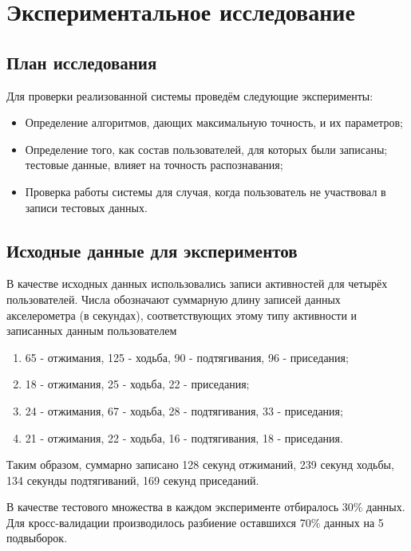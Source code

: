 
\chapter{Экспериментальное исследование}

\section{План исследования}

Для проверки реализованной системы проведём следующие эксперименты:

\begin{itemize}
\item Определение алгоритмов, дающих максимальную точность, и их параметров;
\item Определение того, как состав пользователей, для которых были записаны; тестовые данные, влияет на точность распознавания;
\item Проверка работы системы для случая, когда пользователь не участвовал в записи тестовых данных.
\end{itemize}


\section{Исходные данные для экспериментов}

В качестве исходных данных использовались записи активностей для четырёх пользователей. Числа обозначают суммарную длину записей данных акселерометра (в секундах), соответствующих этому типу активности и записанных данным пользователем

\begin{enumerate}
\item 65 - отжимания, 125 - ходьба, 90 - подтягивания, 96 - приседания; %
\item 18 - отжимания, 25 - ходьба, 22 - приседания; %
\item 24 - отжимания, 67 - ходьба, 28 - подтягивания, 33 - приседания; %
\item 21 - отжимания, 22 - ходьба, 16 - подтягивания, 18 - приседания. %
\end{enumerate}

Таким образом, суммарно записано 128 секунд отжиманий, 239 секунд ходьбы, 134 секунды подтягиваний, 169 секунд приседаний.

В качестве тестового множества в каждом эксперименте отбиралось 30\% данных. Для кросс-валидации производилось разбиение оставшихся 70\% данных на 5 подвыборок.

